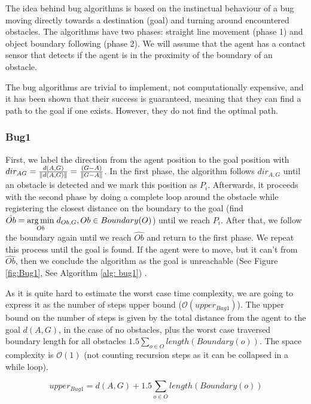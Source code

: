 The idea behind bug algorithms is based on the instinctual behaviour of a bug moving directly towards a destination (goal) and turning around encountered obstacles. The algorithms have two phases: straight line movement (phase 1) and object boundary following (phase 2). We will assume that the agent has a contact sensor that detects if the agent is in the proximity of the boundary of an obstacle.


The bug algorithms are trivial to implement, not computationally expensive, and it has been shown that their success is guaranteed, meaning that they can find a path to the goal if one exists. However, they do not find the optimal path.

\subsubsection{Bug1} \label{sec: bug1}

First, we label the direction from the agent position to the goal position with $dir_{AG} = \frac{d(A, G)
}{\left\lVert d(A, G)\right\rVert} = \frac{(G - A)} {\left\lVert G - A\right\rVert}$. In the first phase, the algorithm follows $dir_{A, G}$ until an obstacle is detected and we mark this position as $P_{i}$. Afterwards, it proceeds with the second phase by doing a complete loop around the obstacle while registering the closest distance on the boundary to the goal (find $\hat{Ob} = \underset{Ob}{\arg \min} \hspace{0.1cm} d_{Ob, G}, Ob \in Boundary(O)$) until we reach $P_{i}$. After that, we follow the boundary again until we reach $\hat{Ob}$ and return to the first phase. We repeat this process until the goal is found. If the agent were to move, but it can't from $\hat{Ob}$, then we conclude the algorithm as the goal is unreachable (See Figure \ref{fig:Bug1}, See Algorithm \ref{alg: bug1}) \cite{lumelsky1986dynamic}.

As it is quite hard to estimate the worst case time complexity, we are going to express it as the number of steps upper bound ($\mathcal{O}(upper_{Bug1})$). The upper bound on the number of steps is given by the total distance from the agent to the goal $d(A, G)$, in the case of no obstacles, plus the worst case traversed boundary length for all obstacles $1.5 \sum_{o \in O} length(Boundary(o))$. The space complexity is $\mathcal{O}(1)$ (not counting recursion steps as it can be collapsed in a while loop).

$$upper_{Bug1} = d(A, G) + 1.5 \sum_{o \in O} length(Boundary(o))$$

